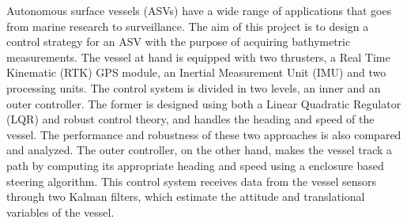 Autonomous surface vessels (ASVs) have a wide range of applications that goes from marine research to surveillance. The aim of this project is to design a control strategy for an ASV with the purpose of acquiring bathymetric measurements. The vessel at hand is equipped with two thrusters, a Real Time Kinematic (RTK) GPS module, an Inertial Measurement Unit (IMU) and two processing units. The control system is divided in two levels, an inner and an outer controller. The former is designed using both a Linear Quadratic Regulator (LQR) and robust control theory, and handles the heading and speed of the vessel. The performance and robustness of these two approaches is also compared and analyzed. The outer controller, on the other hand, makes the vessel track a path by computing its appropriate heading and speed using a enclosure based steering algorithm. This control system receives data from the vessel sensors through two Kalman filters, which estimate the attitude and translational variables of the vessel.
